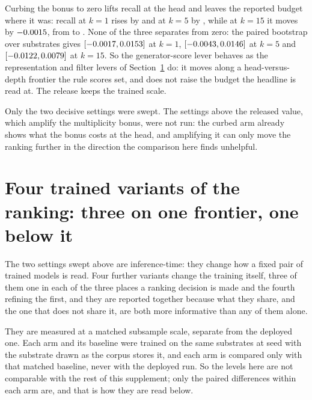 \documentclass[journal=jcisd8,manuscript=suppinfo,layout=onecolumn]{achemso}
\begin{document}
Curbing the bonus to zero lifts recall at the head and leaves the reported budget where it was:
recall at $k=1$ rises by \numMatchscaleDiffOne{} and at $k=5$ by \numMatchscaleDiffFive{}, while at
$k=15$ it moves by $-0.0015{}$, from \numMatchscaleDepOneFive{} to
\numMatchscaleCurbOneFive{}. None of the three separates from zero: the paired bootstrap over
substrates gives $[-0.0017{}, 0.0153{}]$ at $k=1$,
$[-0.0043{}, 0.0146{}]$ at $k=5$ and
$[-0.0122{}, 0.0079{}]$ at $k=15$. So the generator-score lever
behaves as the representation and filter levers of Section~\ref{sec:si-survivors} do: it moves
along a head-versus-depth frontier the rule scores set, and does not raise the budget the headline
is read at. The release keeps the trained scale.

Only the two decisive settings were swept. The settings above the released value, which amplify the
multiplicity bonus, were not run: the curbed arm already shows what the bonus
costs at the head, and amplifying it can only move the ranking further in the direction the
comparison here finds unhelpful.

\section{Four trained variants of the ranking: three on one frontier, one below it}
\label{sec:si-survivors}

The two settings swept above are inference-time: they change how a fixed pair of trained models is
read. Four further variants change the training itself, three of them one in each of the three
places a ranking decision is made and the fourth refining the first, and they are reported together
because what they share, and the one that does not share it, are both more informative than any of
them alone.

They are measured at a matched subsample scale, separate from the deployed one. Each arm and its
baseline were trained on the same \numSurvivorsTrainsubs{} substrates at seed
\numSurvivorsSeed{} with the substrate drawn as the corpus stores it, and each arm is compared only
with that matched baseline, never with the deployed run. So the levels here are not comparable with
the rest of this supplement; only the paired differences within each arm are, and that is how they
are read below.
\end{document}
